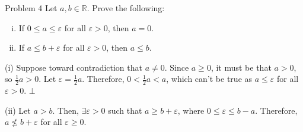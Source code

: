 \documentclass[10pt]{extarticle}
\newcommand{\R}{\mathbb{R}}
\begin{document}
  \begin{problem}{Problem 4}
    Let $a,b\in \R$. Prove the following:
    \begin{enumerate}[(i)]
      \item If $0\leq a\leq \varepsilon$ for all $\varepsilon > 0$, then $a = 0$.
      \item If $a \leq b+\varepsilon$ for all $\varepsilon > 0$, then $a\leq b$.
    \end{enumerate}
    \tcblower
    \begin{problem}{(i)}
      Suppose toward contradiction that $a\neq 0$. Since $a \geq 0$, it must be that $a > 0$, so $\frac{1}{2}a > 0$. Let $\varepsilon = \frac{1}{2}a$. Therefore, $0 < \frac{1}{2}a < a$, which can't be true as $a \leq \varepsilon$ for all $\varepsilon > 0$. $\bot$
    \end{problem}
    \begin{problem}{(ii)}
      Let $a > b$. Then, $\exists \varepsilon > 0$ such that $a \geq b + \varepsilon$, where $0\leq \varepsilon \leq b-a$. Therefore, $a \not\leq b+\varepsilon$ for all $\varepsilon \geq 0$.
    \end{problem}
  \end{problem}
\end{document}
